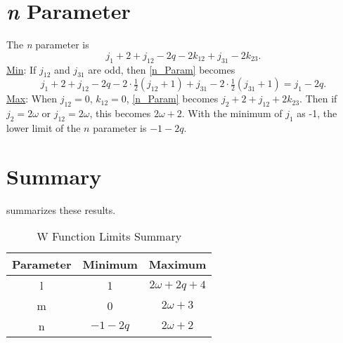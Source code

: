 \documentclass[Dissertation.tex]{subfiles}
\begin{document}
\section{\emph{n} Parameter}
The \emph{n} parameter is
\begin{equation}
	\label{n_Param}j_1 + 2 + j_{12} - 2 q - 2 k_{12} + j_{31} - 2 k_{23}.
\end{equation}
\underline{Min}: If $j_{12}$ and $j_{31}$ are odd, then \cref{n_Param} becomes
	\begin{equation}
	j_1 + 2 + j_{12} - 2q - 2\cdot\tfrac{1}{2}(j_{12}+1) + j_{31} - 2\cdot\tfrac{1}{2}(j_{31}+1) = j_1 - 2q.
	\end{equation}
\underline{Max}: When $j_{12} = 0$, $k_{12} = 0$, \cref{n_Param} becomes
$j_2 + 2 + j_{12} + 2k_{23}$. Then if $j_2 = 2\omega$ or $j_{12} = 2\omega$,
this becomes $2\omega + 2$.  With the minimum of $j_1$ as -1, the lower limit
of the $n$ parameter is $-1 - 2q$.

\section{Summary}
 summarizes these results.

\begin{table}
\centering
\begin{tabular}{c c c}
\toprule
Parameter & Minimum & Maximum \\
\midrule
  l & 1 & $2\omega + 2q + 4$ \\
  m & 0 & $2\omega + 3$ \\
  n	& $-1 - 2q$ & $2\omega + 2$ \\
\bottomrule
\end{tabular}
\caption{W Function Limits Summary}
\label{tab:WLimits}
\end{table}




\biblio
\end{document}

